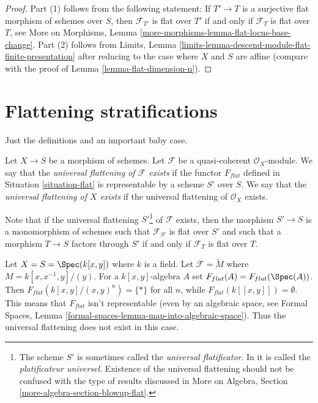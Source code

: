 \begin{proof}
Part (1) follows from the following statement: If $T' \to T$ is a surjective
flat morphism of schemes over $S$, then $\mathcal{F}_{T'}$ is flat over $T'$
if and only if $\mathcal{F}_T$ is flat over $T$, see
More on Morphisms, Lemma \ref{more-morphisms-lemma-flat-locus-base-change}.
Part (2) follows from
Limits, Lemma \ref{limits-lemma-descend-module-flat-finite-presentation}
after reducing to the case where $X$ and $S$ are affine (compare with
the proof of
Lemma \ref{lemma-flat-dimension-n}).
\end{proof}




\section{Flattening stratifications}
\label{section-flattening}

\noindent
Just the definitions and an important baby case.

\begin{definition}
\label{definition-flattening}
Let $X \to S$ be a morphism of schemes.
Let $\mathcal{F}$ be a quasi-coherent $\mathcal{O}_X$-module.
We say that the {\it universal flattening of $\mathcal{F}$ exists}
if the functor $F_{flat}$ defined in Situation \ref{situation-flat}
is representable by a scheme $S'$ over $S$.
We say that the {\it universal flattening of $X$ exists}
if the universal flattening of $\mathcal{O}_X$ exists.
\end{definition}

\noindent
Note that if the universal flattening $S'$\footnote{The scheme $S'$ is sometimes
called the {\it universal flatificator}. In \cite{GruRay} it is called
the {\it platificateur universel}. Existence of the universal flattening
should not be confused with the type of results discussed in
More on Algebra, Section \ref{more-algebra-section-blowup-flat}.} of
$\mathcal{F}$ exists, then the morphism $S' \to S$ is a monomorphism of schemes
such that $\mathcal{F}_{S'}$ is flat over $S'$ and such that a
morphism $T \to S$ factors through $S'$ if and only if $\mathcal{F}_T$
is flat over $T$.

\begin{example}
\label{example-no-universal-flattening}
Let $X = S = \Spec(k[x, y])$ where $k$ is a field. Let
$\mathcal{F} = \widetilde{M}$ where $M = k[x, x^{-1}, y]/(y)$.
For a $k[x, y]$-algebra $A$ set $F_{flat}(A) = F_{flat}(\Spec(A))$.
Then $F_{flat}(k[x, y]/(x, y)^n) = \{*\}$ for all $n$, while
$F_{flat}(k[[x, y]]) = \emptyset$. This means that $F_{flat}$ isn't
representable (even by an algebraic space, see
Formal Spaces, Lemma
\ref{formal-spaces-lemma-map-into-algebraic-space}).
Thus the universal flattening does not exist in this case.
\end{example}


